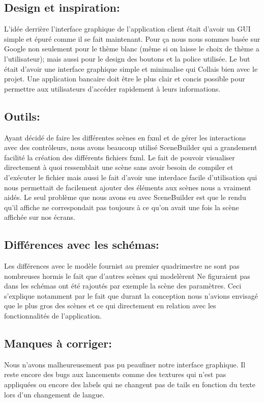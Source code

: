\documentclass[../rapport.tex]{subfiles}
\begin{document}
\subsection{Design et inspiration:}
    
    L'idée derrière l'interface graphique de l'application client était d'avoir un GUI simple et épuré comme il se fait maintenant.
    Pour ça nous nous sommes basée sur Google non seulement pour le thème blanc (même si on laisse le choix de thème a l'utilisateur);
    mais aussi pour le design des boutons et la police utilisée. Le but était d'avoir une interface graphique simple et minimalise qui 
    Collais bien avec le projet. Une application bancaire doit être le plus clair et concis possible pour permettre aux utilisateurs d'accéder
    rapidement à leurs informations.

\subsection{Outils:}

    Ayant décidé de faire les différentes scènes en fxml et de gérer les interactions avec des contrôleurs, nous avons beaucoup utilisé 
    SceneBuilder qui a grandement facilité la création des différents fichiers fxml. Le fait de pouvoir visualiser directement à quoi ressemblait
    une scène sans avoir besoin de compiler et d'exécuter le fichier mais aussi le fait d'avoir une interdace facile d'utilisation qui nous 
    permettait de facilement ajouter des éléments aux scènes nous a vraiment aidés. Le seul problème que nous avons eu avec SceneBuilder est que
    le rendu qu'il affiche ne correspondait pas toujours à ce qu'on avait une fois la scène affichée sur nos écrans.

\subsection{Différences avec les schémas:}

    Les différences avec le modèle fournist au premier quadrimestre ne sont pas nombreuses hormis le fait que d'autres scènes qui modelèrent 
    Ne figuraient pas dans les schémas ont été rajoutés par exemple la scène des paramètres. Ceci s'explique notamment par le fait que 
    durant la conception nous n'avions envisagé que le plus gros des scènes et ce qui directement en relation avec les fonctionnalités
    de l'application.


\subsection{Manques à corriger:}
    Nous n'avons malheureusement pas pu peaufiner notre interface graphique. Il reste encore des bugs aux lancements comme des textures 
    qui n'est pas appliquées ou encore des labels qui ne changent pas de tails en fonction du texte lors d'un changement de langue.
    \newpage
\end{document}
